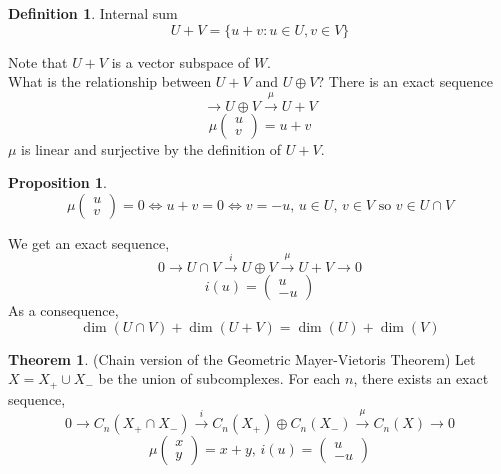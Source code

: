 \documentclass[a4paper,14pt]{extarticle}
\theoremstyle{definition}
\newtheorem*{theorem}{Theorem}
\newtheorem*{definition}{Definition}
\newtheorem*{proposition}{Proposition}
\begin{document}
\begin{definition}{Internal sum}
	\[U+V=\{u+v:u\in U, v\in V\}\]
\end{definition}
Note that $U+V$ is a vector subspace of $W$. \\

What is the relationship between $U+V$ and $U\oplus V$? There is an exact
sequence \[\rightarrow U\oplus V\xrightarrow{\mu}U+V\]
\[\mu\begin{pmatrix}
	u\\v
\end{pmatrix}=u+v\] $\mu$ is linear and surjective by the definition of
$U+V$.

\begin{proposition}
	\[\mu\begin{pmatrix}
		u\\v
	\end{pmatrix}=0\iff u+v=0\iff v=-u, \,u\in U, \,v\in V\text{ so }v\in
	U\cap V\]
\end{proposition}

We get an exact sequence,
\[0\rightarrow U\cap V\xrightarrow{i} U\oplus V\xrightarrow{\mu} U+V
\rightarrow 0\]
\[i(u)=\begin{pmatrix}
	u\\-u
\end{pmatrix}\]
As a consequence, \[\dim(U\cap V)+\dim(U+V)=\dim(U)+\dim(V)\]

\begin{theorem}(Chain version of the Geometric Mayer-Vietoris Theorem)
	Let $X=X_+\cup X_-$ be the union of subcomplexes. For each $n$,
	there exists an exact sequence,
	\[0\rightarrow C_n(X_+\cap X_-)\xrightarrow{i} C_n(X_+)\oplus C_n(X_-)
	\xrightarrow{\mu} C_n(X)\rightarrow 0\]
	\[\mu\begin{pmatrix}
		x\\y
	\end{pmatrix}=x+y, \,i(u)=\begin{pmatrix}
		u\\-u
	\end{pmatrix}\]
\end{theorem}
\end{document}
